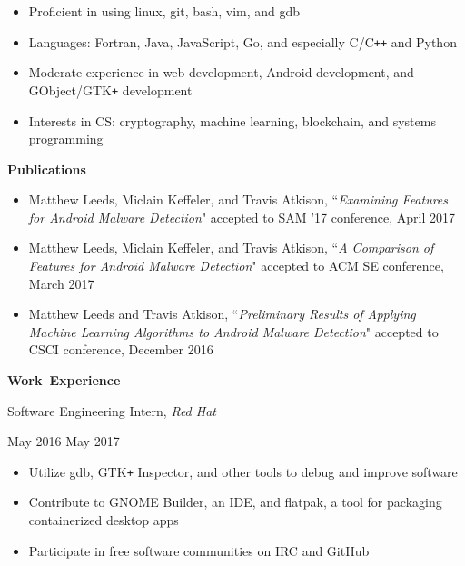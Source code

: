\documentclass[11pt]{article}
\begin{document}
\begin{itemize}
  \item Proficient in using linux, git, bash, vim, and gdb
  \item Languages: Fortran, Java, JavaScript, Go, and especially C/C\texttt{++} and Python
  \item Moderate experience in web development, Android development, and GObject/GTK\texttt{+} development
  \item Interests in CS: cryptography, machine learning, blockchain, and systems programming
\end{itemize}

\vspace{0.8em}
\hbox{\large \textbf{Publications}}

\begin{itemize}[itemindent=0em]
  \item Matthew Leeds, Miclain Keffeler, and Travis Atkison, ``\textit{Examining Features for Android Malware Detection}" accepted to SAM '17 conference, April 2017
  \item Matthew Leeds, Miclain Keffeler, and Travis Atkison, ``\textit{A Comparison of Features for Android Malware Detection}" accepted to ACM SE conference, March 2017
  \item Matthew Leeds and Travis Atkison, ``\textit{Preliminary Results of Applying Machine Learning Algorithms to Android Malware Detection}" accepted to CSCI conference, December 2016
\end{itemize}

\vspace{0.8em}
\hbox{\large \textbf{Work Experience}}

\begin{minipage}[t]{0.65\textwidth}
\flushleft
Software Engineering Intern, \textit{Red Hat}\\
\end{minipage}
\begin{minipage}[t]{0.30\textwidth}
\flushright
May 2016 \space \textemdash \space May 2017\\
\end{minipage}

\begin{itemize}
  \item Utilize gdb, GTK\texttt{+} Inspector, and other tools to debug and improve software
  \item Contribute to GNOME Builder, an IDE, and flatpak, a tool for packaging containerized desktop apps
  \item Participate in free software communities on IRC and GitHub
\end{itemize}
\end{document}
